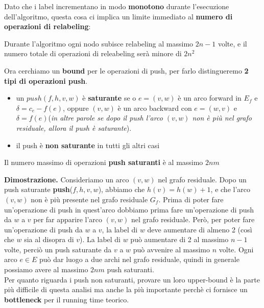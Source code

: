 Dato che i label incrementano in modo \textbf{monotono} durante l'esecuzione dell'algoritmo, questa cosa ci implica un limite immediato al \textbf{numero di operazioni di relabeling}:

\begin{myblockquote}
    Durante l'algoritmo ogni nodo subisce relabeling al massimo $2n-1$ volte, e il numero totale di operazioni di releabeling serà minore di $2n^2$
\end{myblockquote}

Ora cerchiamo un \textbf{bound} per le operazioni di push, per farlo distingueremo \textbf{2 tipi di operazioni push}.
\begin{itemize}
    \item un $push(f, h, v, w)$ è \textbf{saturante} se o $e = (v, w)$ è un arco forward in $E_f$ e $\delta = c_e - f(e)$, oppure $(v,w)$ è un arco backward con $e = (w,v)$ e $\delta = f(e)$(\textit{in altre parole se dopo il push l'arco $(v,w)$ non è più nel grafo residuale, allora il push è saturante}).
    \item il push è \textbf{non saturante} in tutti gli altri casi
\end{itemize}

\begin{myblockquote}
    Il numero massimo di operazioni \textbf{push saturanti} è al massimo $2nm$
\end{myblockquote}

\textbf{Dimostrazione.} 
Consideriamo un arco $(v, w)$ nel grafo residuale. Dopo un push saturante
\textbf{push}($f, h, v, w$), abbiamo che $h(v) = h(w) + 1$, e che l'arco $(v, w)$ non è più presente nel grafo residuale $G_f$. Prima di poter fare un'operazione di push in quest'arco
dobbiamo prima fare un'operazione di push da $w$ a $v$ per far apparire l'arco
$(v, w)$ nel grafo residuale. Però, per poter fare un'operazione di push da $w$ a $v$,
la label di $w$ deve aumentare di almeno 2 (così che $w$ sia al disopra di $v$). La
label di $w$ può aumentare di 2 al massimo $n - 1$ volte, perciò un push saturante da $v$
a $w$ può avvenire al massimo $n$ volte. Ogni arco $e \in E$ può dar luogo a due archi nel grafo residuale, quindi in generale possiamo avere al massimo $2nm$ push saturanti.\\

Per quanto riguarda i push non saturanti, provare un loro upper-bound è la parte più difficile di questa analisi ma anche la più importante perchè ci fornisce un \textbf{bottleneck} per il running time teorico.

